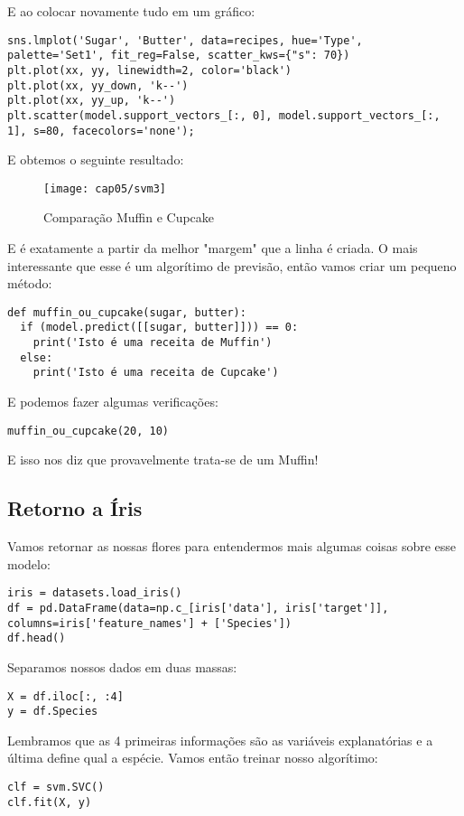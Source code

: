 E ao colocar novamente tudo em um gráfico:
\begin{lstlisting}[]
sns.lmplot('Sugar', 'Butter', data=recipes, hue='Type', palette='Set1', fit_reg=False, scatter_kws={"s": 70})
plt.plot(xx, yy, linewidth=2, color='black')
plt.plot(xx, yy_down, 'k--')
plt.plot(xx, yy_up, 'k--')
plt.scatter(model.support_vectors_[:, 0], model.support_vectors_[:, 1], s=80, facecolors='none');
\end{lstlisting}

E obtemos o seguinte resultado:
\begin{figure}[H]
	\centering
	\texttt{[image: cap05/svm3]}
	\caption{Comparação Muffin e Cupcake}
\end{figure}

E é exatamente a partir da melhor "margem" que a linha é criada. O mais interessante que esse é um algorítimo de previsão, então vamos criar um pequeno método:
\begin{lstlisting}[]
def muffin_ou_cupcake(sugar, butter):
  if (model.predict([[sugar, butter]])) == 0:
    print('Isto é uma receita de Muffin')
  else:
    print('Isto é uma receita de Cupcake')
\end{lstlisting}

E podemos fazer algumas verificações:
\begin{lstlisting}[]
muffin_ou_cupcake(20, 10)
\end{lstlisting}

E isso nos diz que provavelmente trata-se de um Muffin!

\subsection{Retorno a Íris}

Vamos retornar as nossas flores para entendermos mais algumas coisas sobre esse modelo:
\begin{lstlisting}[]
iris = datasets.load_iris()
df = pd.DataFrame(data=np.c_[iris['data'], iris['target']], columns=iris['feature_names'] + ['Species'])
df.head()
\end{lstlisting}

Separamos nossos dados em duas massas:
\begin{lstlisting}[]
X = df.iloc[:, :4]
y = df.Species
\end{lstlisting}

Lembramos que as 4 primeiras informações são as variáveis explanatórias e a última define qual a espécie. Vamos então treinar nosso algorítimo:
\begin{lstlisting}[]
clf = svm.SVC()
clf.fit(X, y)
\end{lstlisting}


